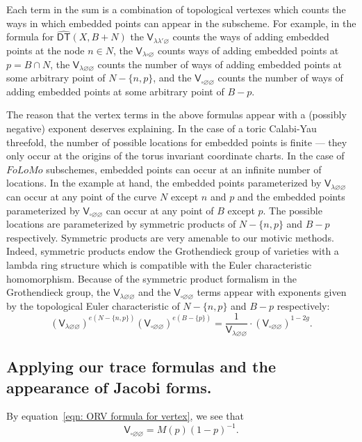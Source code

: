 \documentclass[12pt]{amsart}
\newcommand{\Vsf}{\mathsf{V}}
\newcommand{\bx}{\square}
\renewcommand{\emptyset}{\varnothing}
\theoremstyle{definition}
\newcommand{\DThat}{\operatorname{\widehat{\mathsf{DT}}}}
\newcommand{\folomo}{{FoLoMo }}
\begin{document}
Each term in the sum is a combination of topological vertexes which
counts the ways in which embedded points can appear in the
subscheme. For example, in the formula for $\DThat (X,B+N)$ the
$\Vsf_{\lambda \lambda '\emptyset}$ counts the ways of adding embedded
points at the node $n\in N$, the $\Vsf_{\lambda \bx \emptyset}$ counts
ways of adding embedded points at $p=B\cap N$, the $\Vsf_{\lambda
\emptyset \emptyset}$ counts the number of ways of adding embedded
points at some arbitrary point of $N-\{n,p \}$, and the $\Vsf_{\bx
\emptyset \emptyset}$ counts the number of ways of adding embedded
points at some arbitrary point of $B-p$.

The reason that the vertex terms in the above formulas appear with a
(possibly negative) exponent deserves explaining.  In the case of a
toric Calabi-Yau threefold, the number of possible locations for
embedded points is finite --- they only occur at the origins of the
torus invariant coordinate charts. In the case of $\folomo$
subschemes, embedded points can occur at an infinite number of
locations. In the example at hand, the embedded points parameterized
by $\Vsf_{\lambda \emptyset \emptyset}$ can occur at any point of the
curve $N$ except $n$ and $p$ and the embedded points parameterized by
$\Vsf_{\bx \emptyset \emptyset}$ can occur at any point of $B$ except
$p$. The possible locations are parameterized by symmetric products of
$N-\{n,p \}$ and $B-p$ respectively.  Symmetric products are very
amenable to our motivic methods. Indeed, symmetric products endow the
Grothendieck group of varieties with a lambda ring structure which is
compatible with the Euler characteristic homomorphism. Because of the
symmetric product formalism in the Grothendieck group, the
$\Vsf_{\lambda \emptyset \emptyset}$ and the $\Vsf_{\bx \emptyset
\emptyset}$ terms appear with exponents given by the topological Euler
characteristic of $N-\{n,p \}$ and $B-p$ respectively:
\[
(\Vsf_{\lambda \emptyset \emptyset})^{e(N-\{n,p \})}(\Vsf_{\bx \emptyset \emptyset})^{e(B-\{p \})}
=\frac{1}{\Vsf_{\lambda \emptyset \emptyset}}\cdot (\Vsf_{\bx \emptyset \emptyset})^{1-2g} .
\]




\subsection{Applying our trace formulas and the appearance of Jacobi forms.}
By equation~\eqref{eqn: ORV formula for vertex}, we see that 
\[
\Vsf_{\bx \emptyset \emptyset} =M(p) (1-p)^{-1}.
\]
\end{document}
